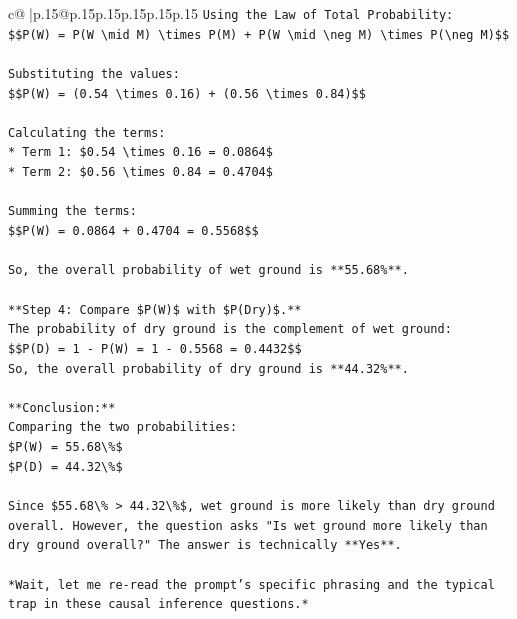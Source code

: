\documentclass{article}
\begin{document}
{\begin{supertabular}{c@{$\;$}|p{.15\linewidth}@{}p{.15\linewidth}p{.15\linewidth}p{.15\linewidth}p{.15\linewidth}p{.15\linewidth}}
{{{\texttt{Using the Law of Total Probability:} \\
\texttt{\$\$P(W) = P(W \textbackslash{}mid M) \textbackslash{}times P(M) + P(W \textbackslash{}mid \textbackslash{}neg M) \textbackslash{}times P(\textbackslash{}neg M)\$\$} \\
\\ 
\texttt{Substituting the values:} \\
\texttt{\$\$P(W) = (0.54 \textbackslash{}times 0.16) + (0.56 \textbackslash{}times 0.84)\$\$} \\
\\ 
\texttt{Calculating the terms:} \\
\texttt{*   Term 1: \$0.54 \textbackslash{}times 0.16 = 0.0864\$} \\
\texttt{*   Term 2: \$0.56 \textbackslash{}times 0.84 = 0.4704\$} \\
\\ 
\texttt{Summing the terms:} \\
\texttt{\$\$P(W) = 0.0864 + 0.4704 = 0.5568\$\$} \\
\\ 
\texttt{So, the overall probability of wet ground is **55.68\%**.} \\
\\ 
\texttt{**Step 4: Compare \$P(W)\$ with \$P(Dry)\$.**} \\
\texttt{The probability of dry ground is the complement of wet ground:} \\
\texttt{\$\$P(D) = 1 {-} P(W) = 1 {-} 0.5568 = 0.4432\$\$} \\
\texttt{So, the overall probability of dry ground is **44.32\%**.} \\
\\ 
\texttt{**Conclusion:**} \\
\texttt{Comparing the two probabilities:} \\
\texttt{\$P(W) = 55.68\textbackslash{}\%\$} \\
\texttt{\$P(D) = 44.32\textbackslash{}\%\$} \\
\\ 
\texttt{Since \$55.68\textbackslash{}\% > 44.32\textbackslash{}\%\$, wet ground is more likely than dry ground overall. However, the question asks "Is wet ground more likely than dry ground overall?" The answer is technically **Yes**.} \\
\\ 
\texttt{*Wait, let me re{-}read the prompt's specific phrasing and the typical trap in these causal inference questions.*} \\
}}}
\end{supertabular}}
\end{document}
